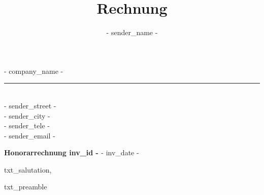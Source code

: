 \documentclass{invoice-de}
\title{Rechnung}
\author{ {{- sender_name -}} }
\newlength{\rt}\setlength{\rt}{0.4pt}
\begin{document}

{\flushright
{\large{ {{- company_name -}} }}\\
    \vspace{-0.7em}
    \rule{160mm}{\rt}\\
    \vspace{0.5em}
    {{- sender_street -}}\\
{{- sender_city -}}\\
{{- sender_tele -}}\\
{{- sender_email -}}\\
}

{
}


    \vspace{2em}
    {\bf{ Honorarrechnung {{ inv_id -}} }} \hfill{ {{- inv_date -}} }\\

    \RaggedRight

    {{txt_salutation}},

    \vspace{1em}

    {{txt_preamble}}


    \begin{invoiceTable}
        \subtotal



    \end{invoiceTable}
\end{document}
